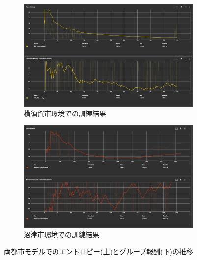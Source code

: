\begin{figure}[H]
  \centering
  \begin{subfigure}{0.45\textwidth}
      \centering
      \includegraphics[width=\textwidth]{Figures/YokosukaModel-Result.png}
      \caption{横須賀市環境での訓練結果}
      \label{fig:YokosukaModel-Result}
  \end{subfigure}
  \begin{subfigure}{0.45\textwidth}
      \centering
      \includegraphics[width=\textwidth]{Figures/NumazuModel-Result.png}
      \caption{沼津市環境での訓練結果}
      \label{fig:NumazuModel-Result}
  \end{subfigure}
  \caption{両都市モデルでのエントロピー(上)とグループ報酬(下)の推移}
  \label{fig:Model-Result1}
\end{figure}
